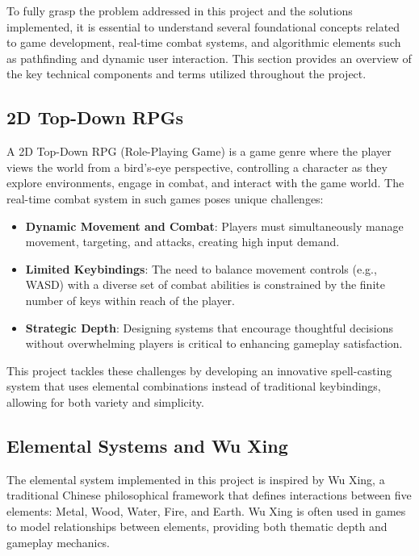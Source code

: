 \documentclass[10pt,twocolumn]{article}
\begin{document}
To fully grasp the problem addressed in this project and the solutions implemented, it is essential to understand several foundational concepts related to game development, real-time combat systems, and algorithmic elements such as pathfinding and dynamic user interaction. This section provides an overview of the key technical components and terms utilized throughout the project.

\subsection{2D Top-Down RPGs}
A 2D Top-Down RPG (Role-Playing Game) is a game genre where the player views the world from a bird's-eye perspective, controlling a character as they explore environments, engage in combat, and interact with the game world. The real-time combat system in such games poses unique challenges:
\begin{itemize}
    \item \textbf{Dynamic Movement and Combat}: Players must simultaneously manage movement, targeting, and attacks, creating high input demand.
    \item \textbf{Limited Keybindings}: The need to balance movement controls (e.g., WASD) with a diverse set of combat abilities is constrained by the finite number of keys within reach of the player.
    \item \textbf{Strategic Depth}: Designing systems that encourage thoughtful decisions without overwhelming players is critical to enhancing gameplay satisfaction.
\end{itemize}

This project tackles these challenges by developing an innovative spell-casting system that uses elemental combinations instead of traditional keybindings, allowing for both variety and simplicity.

\subsection{Elemental Systems and Wu Xing}
The elemental system implemented in this project is inspired by Wu Xing, a traditional Chinese philosophical framework that defines interactions between five elements: Metal, Wood, Water, Fire, and Earth. Wu Xing is often used in games to model relationships between elements, providing both thematic depth and gameplay mechanics.
\end{document}
